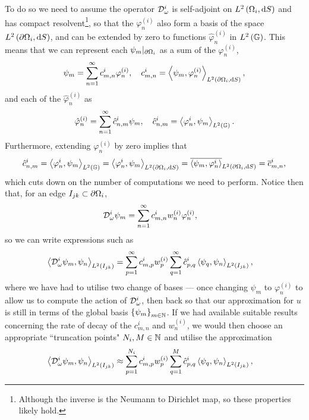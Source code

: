 To do so we need to assume the operator $\mathcal{D}_{\omega}^i$ is self-adjoint on $L^{2}\left( \Omega_i,\mathrm{d} S \right)$ and has compact resolvent\footnote{Although the inverse is the Neumann to Dirichlet map, so these properties likely hold.}, so that the $\varphi^{(i)}_n$ also form a basis of the space $L^{2}\left( \partial\Omega_i,\mathrm{d} S \right)$, and can be extended by zero to functions $\hat{\varphi}_n^{(i)}$ in $L^2\left( \mathbb{G} \right)$.
This means that we can represent each $\psi_m\vert_{\partial\Omega_i}$ as a sum of the $\varphi_n^{(i)}$,
\begin{align*}
	\psi_m = \sum_{n=1}^{\infty} c_{m,n}^i \varphi_n^{(i)}, \quad c_{m,n}^i = \left\langle \psi_m , \varphi_n^{(i)} \right\rangle_{L^{2}\left( \partial\Omega_i,\mathrm{d} S \right)},
\end{align*}
and each of the $\hat{\varphi}_n^{(i)}$ as
\begin{align*}
	\hat{\varphi}_n^{(i)} = \sum_{n=1}^{\infty} \hat{c}_{n,m}^i \psi_m, \quad \hat{c}_{n,m}^i = \left\langle \varphi_n^i , \psi_m \right\rangle_{L^2\left( \mathbb{G} \right)}.
\end{align*}
Furthermore, extending $\varphi_n^{(i)}$ by zero implies that
\begin{align*}
	\hat{c}_{n,m}^i = \left\langle \varphi_n^i , \psi_m \right\rangle_{L^2\left( \mathbb{G} \right)} = \left\langle \varphi_n^i , \psi_m \right\rangle_{L^{2}\left( \partial\Omega_i,\mathrm{d} S \right)} = \overline{\left\langle \psi_m , \varphi_n^i \right\rangle}_{L^{2}\left( \partial\Omega_i,\mathrm{d} S \right)} = \overline{c}_{m,n}^i,
\end{align*}
which cuts down on the number of computations we need to perform.
Notice then that, for an edge $I_{jk}\subset\partial\Omega_i$,
\begin{align*}
	\mathcal{D}^i_\omega \psi_m
	&= \sum_{n=1}^{\infty} c_{m,n}^i w_n^{(i)} \varphi_n^{(i)},
\end{align*}
so we can write expressions such as
\begin{align*}
	\left\langle \mathcal{D}^i_\omega \psi_m , \psi_n \right\rangle_{L^2\left( I_{jk} \right)}
	&= \sum_{p=1}^{\infty}c_{m,p}^i w^{(i)}_p \sum_{q=1}^{\infty} \hat{c}_{p,q}^i \left\langle \psi_q , \psi_n \right\rangle_{L^2\left( I_{jk} \right)},
\end{align*}
where we have had to utilise two change of bases --- once changing $\psi_m$ to $\varphi^{(i)}_n$ to allow us to compute the action of $\mathcal{D}^i_\omega$, then back so that our approximation for $u$ is still in terms of the global basis $\left\{ \psi_m \right\}_{m\in\mathbb{N}}$.
If we had available suitable results concerning the rate of decay of the $c_{m,n}^i$ and $w_n^{(i)}$, we would then choose an appropriate ``truncation points" $N_i,M\in\mathbb{N}$ and utilise the approximation
\begin{align*}
	\left\langle \mathcal{D}^i_\omega \psi_m , \psi_n \right\rangle_{L^2\left( I_{jk} \right)}
	&\approx \sum_{p=1}^{N_i}c_{m,p}^i w^{(i)}_p \sum_{q=1}^{M} \hat{c}_{p,q}^i \left\langle \psi_q , \psi_n \right\rangle_{L^2\left( I_{jk} \right)},
\end{align*}

